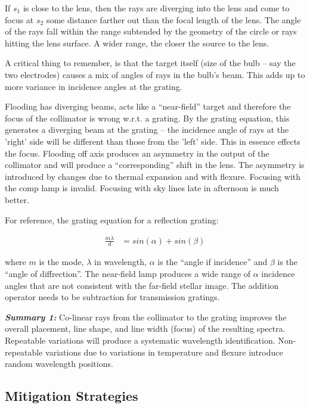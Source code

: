 \documentclass[letter,11pt,oneside]{article}
\begin{document}
If $s_{1}$ is close to the lens, then the rays are diverging into the
lens and come to focus at $s_{2}$ some distance farther out than the
focal length of the lens. The angle of the rays fall within the
range subtended by the geometry of the circle or rays hitting the lens
surface. A wider range, the closer the source to the lens. 

A critical thing to remember, is that the target itself (size of the
bulb -- say the two electrodes) causes a mix of angles of rays in the
bulb's beam. This adds up to more variance in incidence angles at the
grating.

Flooding has diverging beams, acts like a ``near-field'' target and
therefore the focus of the collimator is wrong w.r.t. a grating. By
the grating equation, this generates a diverging beam at the grating
-- the incidence angle of rays at the 'right' side will be different
than those from the 'left' side. This in essence effects the focus.
Flooding off axis produces an asymmetry in the output of the
collimator and will produce a ``corresponding'' shift in the lens. The
asymmetry is introduced by changes due to thermal expansion and with
flexure.  Focusing with the comp lamp is invalid. Focusing with sky
lines late in afternoon is much better.

For reference, the grating equation for a reflection grating:


\begin{align}
\frac{m\lambda}{d} &= sin(\alpha) + sin(\beta)
\end{align}

where $m$ is the mode, $\lambda$ in wavelength, $\alpha$ is the
``angle if incidence'' and $\beta$ is the ``angle of diffrection''.
The near-field lamp produces a wide range of $\alpha$ incidence angles
that are not consistent with the far-field stellar image. The addition
operator needs to be subtraction for transmission gratings.

\textbf{\emph{Summary 1:}} Co-linear rays from the collimator to the grating improves
the overall placement, line shape, and line width (focus) of the resulting
spectra. Repeatable variations will produce a systematic wavelength
identification. Non-repeatable variations due to variations in temperature
and flexure introduce random wavelength positions.

\subsection{Mitigation Strategies}
\end{document}
